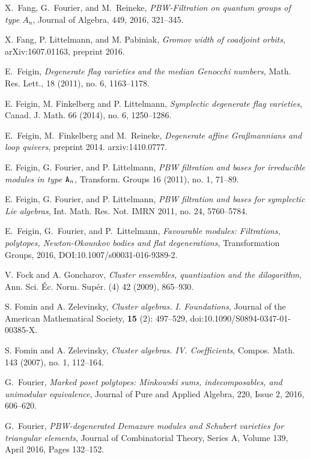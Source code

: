 \documentclass{emsprocart}
\theoremstyle{definition}
\begin{document}
\begin{thebibliography}{7}
X.~Fang, G.~Fourier, and M.~Reineke, \textit{PBW-Filtration on quantum groups of type $A_n$}, Journal of Algebra,  449, 2016, 321--345.

X. Fang, P. Littelmann, and M. Pabiniak,
{\it Gromov width of coadjoint orbits},  arXiv:1607.01163, preprint 2016.

E.~Feigin, \textit{Degenerate flag varieties and the median Genocchi numbers}, Math. Res. Lett., 18 (2011), no. 6, 1163--1178.

E. Feigin, M. Finkelberg and P. Littelmann, \textit{Symplectic degenerate flag varieties}, Canad. J. Math. 66 (2014), no. 6, 1250--1286.

E.~Feigin, M.~Finkelberg and M.~Reineke, \textit{Degenerate affine Gra\ss mannians and loop quivers}, preprint 2014. arxiv:1410.0777.

E. Feigin, G. Fourier, and P. Littelmann,  \textit{PBW filtration and bases for irreducible modules in type ${\tt A}_n$},
Transform. Groups 16 (2011), no. 1, 71--89.

E. Feigin, G. Fourier, and P. Littelmann, \textit{PBW filtration and bases for symplectic Lie algebras},
Int. Math. Res. Not. IMRN 2011, no. 24, 5760--5784.

E.~Feigin, G.~Fourier, and P.~Littelmann, \textit{Favourable modules: Filtrations, polytopes, Newton-Okounkov bodies and flat degenerations},
Transformation Groups, 2016, DOI:10.1007/s00031-016-9389-2.

V. Fock and A. Goncharov, \textit{Cluster ensembles, quantization and the dilogarithm}, Ann. Sci. \'Ec. Norm. Sup\'er. (4) 42 (2009), 865--930.

S. Fomin and A. Zelevinsky, \textit{Cluster algebras. I. Foundations}, Journal of the American Mathematical Society, {\bf 15} (2): 
497--529, doi:10.1090/S0894-0347-01-00385-X.

S. Fomin and A. Zelevinsky,
\textit{Cluster algebras. IV. Coefficients}, Compos. Math. 143 (2007), no. 1, 112--164.

G.~Fourier, \textit{Marked poset polytopes: Minkowski sums, indecomposables, and unimodular equivalence},
Journal of Pure and Applied Algebra, 220, Issue 2, 2016,  606--620.

G.~Fourier, \textit{PBW-degenerated Demazure modules and Schubert varieties for triangular elements},
Journal of Combinatorial Theory, Series A, Volume 139, April 2016, Pages 132--152.


\end{thebibliography}
\end{document}
